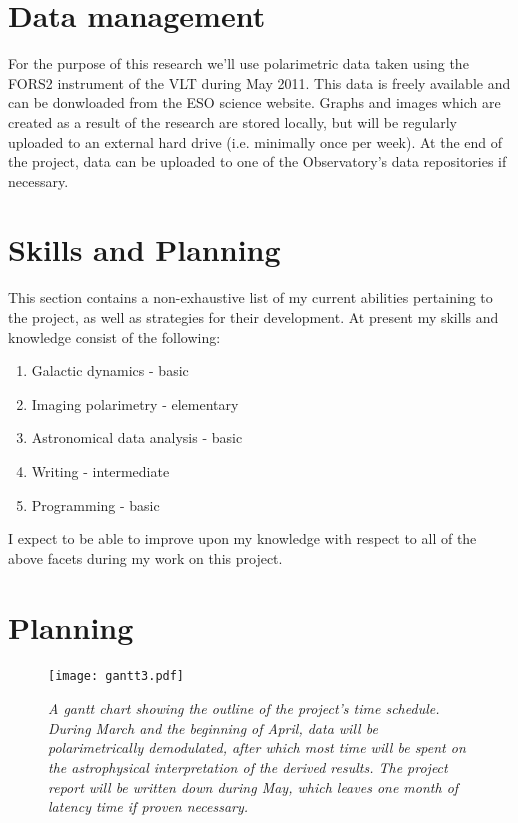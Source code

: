 \documentclass[twoside,single]{lion-msc}
\begin{document}
    
 
\chapter{Data management}

    For the purpose of this research we'll use polarimetric data taken using the FORS2 instrument of the VLT during May 2011. This data is freely available and can be donwloaded from the ESO science website. Graphs and images which are created as a result of the research are stored locally, but will be regularly uploaded to an external hard drive (i.e. minimally once per week). At the end of the project, data can be uploaded to one of the Observatory's data repositories if necessary.
    
    
    
\chapter{Skills and Planning}
    
    This section contains a non-exhaustive list of my current abilities pertaining to the project, as well as strategies for their development. At present my skills and knowledge consist of the following:
    
    \begin{enumerate}
        \item Galactic dynamics - basic
        \item Imaging polarimetry - elementary
        \item Astronomical data analysis - basic
        \item Writing - intermediate
        \item Programming - basic
    \end{enumerate}
    
    I expect to be able to improve upon my knowledge with respect to all of the above facets during my work on this project. 
    
    
    
\chapter{Planning}

    \begin{figure}[h]
      \centering
        \texttt{[image: gantt3.pdf]}
      \caption{\textit{A gantt chart showing the outline of the project's time schedule. During March and the beginning of April, data will be polarimetrically demodulated, after which most time will be spent on the astrophysical interpretation of the derived results. The project report will be written down during May, which leaves one month of latency time if proven necessary.}}
      \label{fig:gantt}
    \end{figure}
\end{document}
